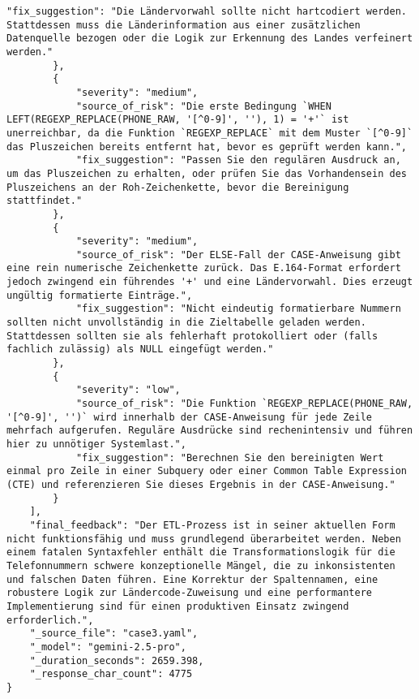 \begin{lstlisting}[caption={Ausgabe: GEMINI 2.5 Pro Anwendungsfall 3 Robustheitsdurchlauf},label={gemini_case3_prompt3}]
            "fix_suggestion": "Die Ländervorwahl sollte nicht hartcodiert werden. Stattdessen muss die Länderinformation aus einer zusätzlichen Datenquelle bezogen oder die Logik zur Erkennung des Landes verfeinert werden."
        },
        {
            "severity": "medium",
            "source_of_risk": "Die erste Bedingung `WHEN LEFT(REGEXP_REPLACE(PHONE_RAW, '[^0-9]', ''), 1) = '+'` ist unerreichbar, da die Funktion `REGEXP_REPLACE` mit dem Muster `[^0-9]` das Pluszeichen bereits entfernt hat, bevor es geprüft werden kann.",
            "fix_suggestion": "Passen Sie den regulären Ausdruck an, um das Pluszeichen zu erhalten, oder prüfen Sie das Vorhandensein des Pluszeichens an der Roh-Zeichenkette, bevor die Bereinigung stattfindet."
        },
        {
            "severity": "medium",
            "source_of_risk": "Der ELSE-Fall der CASE-Anweisung gibt eine rein numerische Zeichenkette zurück. Das E.164-Format erfordert jedoch zwingend ein führendes '+' und eine Ländervorwahl. Dies erzeugt ungültig formatierte Einträge.",
            "fix_suggestion": "Nicht eindeutig formatierbare Nummern sollten nicht unvollständig in die Zieltabelle geladen werden. Stattdessen sollten sie als fehlerhaft protokolliert oder (falls fachlich zulässig) als NULL eingefügt werden."
        },
        {
            "severity": "low",
            "source_of_risk": "Die Funktion `REGEXP_REPLACE(PHONE_RAW, '[^0-9]', '')` wird innerhalb der CASE-Anweisung für jede Zeile mehrfach aufgerufen. Reguläre Ausdrücke sind rechenintensiv und führen hier zu unnötiger Systemlast.",
            "fix_suggestion": "Berechnen Sie den bereinigten Wert einmal pro Zeile in einer Subquery oder einer Common Table Expression (CTE) und referenzieren Sie dieses Ergebnis in der CASE-Anweisung."
        }
    ],
    "final_feedback": "Der ETL-Prozess ist in seiner aktuellen Form nicht funktionsfähig und muss grundlegend überarbeitet werden. Neben einem fatalen Syntaxfehler enthält die Transformationslogik für die Telefonnummern schwere konzeptionelle Mängel, die zu inkonsistenten und falschen Daten führen. Eine Korrektur der Spaltennamen, eine robustere Logik zur Ländercode-Zuweisung und eine performantere Implementierung sind für einen produktiven Einsatz zwingend erforderlich.",
    "_source_file": "case3.yaml",
    "_model": "gemini-2.5-pro",
    "_duration_seconds": 2659.398,
    "_response_char_count": 4775
}
\end{lstlisting}

